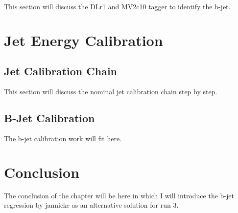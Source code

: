 This section will discuss the DLr1 and MV2c10 tagger to identify the b-jet.

\section{Jet Energy Calibration}
\label{Jet:Cal}

\subsection{Jet Calibration Chain}
\label{Jet:Cal:chain}

This section will discuss the nominal jet calibration chain step by step. 

\subsection{B-Jet Calibration}
\label{Jet:Cal:BCal}

The b-jet calibration work will fit here.

\section{Conclusion}
\label{Jet:Conc}

The conclusion of the chapter will be here in which I will introduce the b-jet regression by jannicke as an alternative solution for run 3.